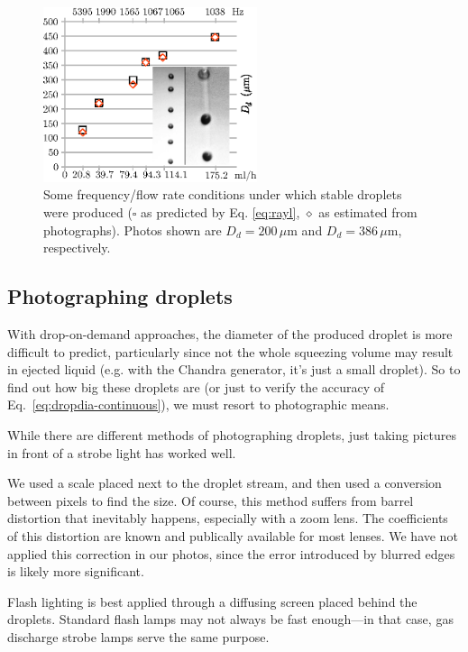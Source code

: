 \documentclass[11.5pt,oneside]{book}
\begin{document}
\begin{figure}[h!]
\centering
\includegraphics[width=0.56\textwidth]{papers/hdg_images/sizes.eps}
\caption{Some frequency/flow rate conditions under which stable droplets were
        produced ($\square$ as predicted by Eq. \ref{eq:rayl},
        {\Large$\diamond$} as estimated
        from photographs). Photos shown are $D_d = 200\,\mu$m and $D_d = 386\,\mu$m,
        respectively.
       \label{fig:dropphoto}}
\end{figure}

\subsection{Photographing droplets}
With drop-on-demand approaches, the diameter of the produced droplet is more
difficult to predict, particularly since not the whole squeezing volume may
result in ejected liquid (e.g. with the Chandra generator, it's just a small
droplet). So to find out how big these droplets are (or just to verify the accuracy of
Eq.~\eqref{eq:dropdia-continuous}), we must resort to photographic means.

While there are different methods of photographing droplets, just taking
pictures in front of a strobe light has worked well.

We used a scale placed next to the droplet stream, and then used a conversion
between pixels to find the size. Of course, this method suffers from barrel
distortion that inevitably happens, especially with a zoom lens. The
coefficients of this distortion are known and publically available for most
lenses. We have not applied this correction in our photos, since the error
introduced by blurred edges is likely more significant.

Flash lighting is best applied through a diffusing screen placed behind the
droplets. Standard flash lamps may not always be fast enough---in that case,
gas discharge strobe lamps serve the same purpose.
\end{document}
